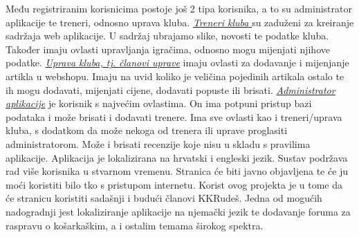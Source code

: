 \bigbreak
\textnormal {Među registriranim korisnicima postoje još 2 tipa korisnika, a to su administrator aplikacije te treneri, odnosno uprava kluba.}
\bigbreak
\underline{\textit{Treneri kluba} }\textnormal {su zaduženi za kreiranje sadržaja web aplikacije. U sadržaj ubrajamo slike, novosti te podatke kluba.  Također imaju ovlasti upravljanja igračima, odnosno mogu mijenjati njihove podatke.}
\bigbreak
\underline{\textit{Uprava kluba, tj. članovi uprave}} \textnormal {imaju ovlasti za dodavanje i mijenjanje artikla u webshopu. Imaju na uvid koliko je veličina pojedinih artikala ostalo te ih mogu dodavati, mijenjati cijene, dodavati popuste ili brisati.}
\bigbreak
\textit{\underline{Administrator  aplikacije} }\textnormal {je korisnik s najvećim ovlastima. On ima potpuni pristup bazi podataka i može brisati i dodavati trenere. Ima sve ovlasti kao i treneri/uprava kluba, s dodatkom da može nekoga od trenera ili uprave proglasiti administratorom. Može i brisati recenzije koje nisu u skladu s pravilima aplikacije.}
\bigbreak
\textnormal{Aplikacija je lokalizirana na hrvatski i engleski jezik. Sustav podržava rad više korisnika u stvarnom vremenu.}
\textnormal{Stranica će biti javno objavljena te će ju moći koristiti bilo tko s pristupom internetu. Korist ovog projekta je u tome da će stranicu koristiti sadašnji i budući članovi KKRudeš. Jedna od mogućih nadogradnji jest lokaliziranje aplikacije na njemački jezik te dodavanje foruma za raspravu o košarkaškim, a i ostalim temama širokog spektra.}
		
		


		
		

		
